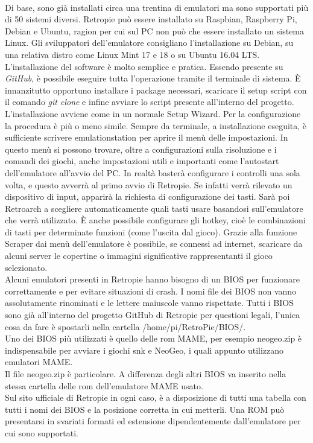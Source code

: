 \\Di base, sono già installati circa una trentina di emulatori ma sono supportati più di 50 sistemi diversi. Retropie può essere installato su Raspbian, Raspberry Pi, Debian e Ubuntu, ragion per cui sul PC non può che essere installato un sistema Linux. Gli sviluppatori dell’emulatore consigliano l’installazione su Debian, su una relativa distro come Linux Mint 17 e 18 o su Ubuntu 16.04 LTS.\\L’installazione del software è molto semplice e pratica. Essendo presente su \textit{GitHub}, è possibile eseguire tutta l’operazione tramite il terminale di sistema. È innanzitutto opportuno installare i package necessari, scaricare il setup script con il comando \textit{git clone} e infine avviare lo script presente all’interno del progetto. L’installazione avviene come in un normale Setup Wizard. Per la configurazione la procedura è più o meno simile. Sempre da terminale, a installazione eseguita, è sufficiente scrivere emulationstation per aprire il menù delle impostazioni. In questo menù si possono trovare, oltre a configurazioni sulla risoluzione e i comandi dei giochi, anche impostazioni utili e importanti come l’autostart dell’emulatore all’avvio del PC. In realtà basterà configurare i controlli una sola volta, e questo avverrà al primo avvio di Retropie. Se infatti verrà rilevato un dispositivo di input, apparirà la richiesta di configurazione dei tasti. Sarà poi Retroarch a scegliere automaticamente quali tasti usare basandosi sull’emulatore che verrà utilizzato. È anche possibile configurare gli hotkey, cioè le combinazioni di tasti per determinate funzioni (come l’uscita dal gioco). Grazie alla funzione Scraper dai menù dell’emulatore è possibile, se connessi ad internet, scaricare da alcuni server le copertine o immagini significative rappresentanti il gioco selezionato.\\Alcuni emulatori presenti in Retropie hanno bisogno di un BIOS per funzionare correttamente e per evitare situazioni di crash. I nomi file dei BIOS non vanno assolutamente rinominati e le lettere maiuscole vanno rispettate. Tutti i BIOS sono già all’interno del progetto GitHub di Retropie per questioni legali, l’unica cosa da fare è spostarli nella cartella /home/pi/RetroPie/BIOS/.\\Uno dei BIOS più utilizzati è quello delle rom MAME, per esempio neogeo.zip è indispensabile per avviare i giochi \gls{snk} e NeoGeo, i quali appunto utilizzano emulatori MAME.\\Il file neogeo.zip è particolare. A differenza degli altri BIOS va inserito nella stessa cartella delle rom dell’emulatore MAME usato.\\Sul sito ufficiale di Retropie in ogni caso, è a disposizione di tutti una tabella con tutti i nomi dei BIOS e la posizione corretta in cui metterli. Una ROM può presentarsi in svariati formati ed estensione dipendentemente dall’emulatore per cui sono supportati.